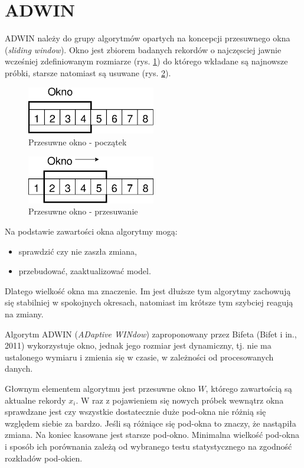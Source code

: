 \section{ADWIN}
\label{sec:ADWIN}
ADWIN należy do grupy algorytmów opartych na koncepcji przesuwnego okna (\textit{sliding window}).
Okno jest zbiorem badanych rekordów o najczęsciej jawnie wcześniej zdefiniowanym rozmiarze (rys. \ref{fig:SlidingWindowInit})
do którego wkładane są najnowsze próbki, starsze natomiast są usuwane (rys. \ref{fig:SlidingWindowMove}).
\begin{figure}[htbp]
\centering
	\includegraphics[width=0.5\textwidth]{img/slidingWindowInit}
	\caption{Przesuwne okno - początek}
  \label{fig:SlidingWindowInit}
\end{figure}
\begin{figure}[htbp]
\centering
	\includegraphics[width=0.5\textwidth]{img/slidingWindowMove}
	\caption{Przesuwne okno - przesuwanie}
  \label{fig:SlidingWindowMove}
\end{figure}
Na podstawie zawartości okna algorytmy mogą:
\begin{itemize}
  \item sprawdzić czy nie zaszła zmiana,
  \item przebudować, zaaktualizować model.
\end{itemize}
Dlatego wielkość okna ma znaczenie.
Im jest dłuższe tym algorytmy zachowują się stabilniej w spokojnych okresach,
natomiast im krótsze tym szybciej reagują na zmiany.

Algorytm ADWIN (\textit{ADaptive WINdow}) zaproponowany przez Bifeta (Bifet i in., 2011)
wykorzystuje okno, jednak jego rozmiar jest dynamiczny,
tj. nie ma ustalonego wymiaru i zmienia się w czasie, w zależności od procesowanych danych.

Głownym elementem algorytmu jest przesuwne okno $W$,
którego zawartością są aktualne rekordy $x_{i}$.
W raz z pojawieniem się nowych próbek wewnątrz okna
sprawdzane jest czy wszystkie dostatecznie duże pod-okna nie różnią się względem siebie za bardzo.
Jeśli są różniące się pod-okna to znaczy,
że nastąpiła zmiana. Na koniec kasowane jest starsze pod-okno.
Minimalna wielkość pod-okna i sposób ich porównania zależą od wybranego testu statystycznego
na zgodność rozkładów pod-okien.
